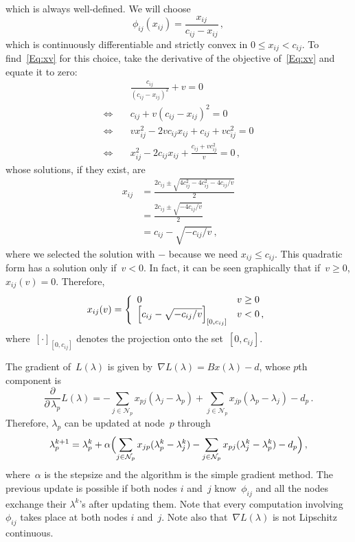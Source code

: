 \documentclass[letter,10pt]{article}
\theoremstyle{definition}
\theoremstyle{nonumberplain}
\begin{document}
	which is always well-defined. We will choose
	$$
		\phi_{ij}(x_{ij}) = \frac{x_{ij}}{c_{ij} - x_{ij}}\,,
	$$
	which is continuously differentiable and strictly convex in $0\leq x_{ij} < c_{ij}$. To find~\eqref{Eq:xv} for this choice, take the derivative of the objective of~\eqref{Eq:xv} and equate it to zero:
	\begin{align*}
		&\frac{c_{ij}}{(c_{ij} - x_{ij})^2} + v = 0
		\\
		\Longleftrightarrow\quad
		&
		c_{ij} + v(c_{ij} - x_{ij})^2 = 0
		\\
		\Longleftrightarrow\quad
		&
		v x_{ij}^2 - 2 v c_{ij} x_{ij} + c_{ij} + v c_{ij}^2 = 0
		\\
		\Longleftrightarrow\quad
		&
		x_{ij}^2 - 2 c_{ij} x_{ij} +  \frac{c_{ij} + v c_{ij}^2}{v} = 0\,,
	\end{align*}
	whose solutions, if they exist, are
	\begin{align*}
		  x_{ij}
		&=
		  \frac{2c_{ij} \pm \sqrt{4c_{ij}^2 - 4c_{ij}^2 - 4c_{ij}/v}}{2}
		\\
		&=
		  \frac{2c_{ij} \pm \sqrt{- 4c_{ij}/v}}{2}
		\\
		&=
		  c_{ij} - \sqrt{-c_{ij}/v}\,,
	\end{align*}
	where we selected the solution with $-$ because we need $x_{ij} \leq c_{ij}$. This quadratic form has a solution only if~$v < 0$. In fact, it can be seen graphically that if~$v \geq 0$, $x_{ij}(v) = 0$. Therefore,
	$$
		x_{ij}(v) =
		\left\{
			\begin{array}{ll}
				0 & v\geq 0 \\
				\Bigl[c_{ij} - \sqrt{-c_{ij}/v}\Bigr]_{[0,c_{ij}]} & v<0\,,
			\end{array}
		\right.
	$$
	where~$[\cdot]_{[0,c_{ij}]}$ denotes the projection onto the set~$[0,c_{ij}]$.

	The gradient of~$L(\lambda)$ is given by~$\nabla L(\lambda) = B x(\lambda) - d$, whose $p$th component is
	$$
		\frac{\partial}{\partial\, \lambda_p} L(\lambda) = -\sum_{j \in \mathcal{N}_p} x_{pj}(\lambda_j - \lambda_p) + \sum_{j \in \mathcal{N}_p} x_{jp}(\lambda_p - \lambda_j) - d_p\,.
	$$
	Therefore, $\lambda_p$ can be updated at node~$p$ through
	$$
		\lambda_p^{k+1} = \lambda_p^{k} + \alpha \Bigl(\sum_{j \in \mathcal{N}_p} x_{jp}(\lambda_p^k - \lambda_j^k)  -\sum_{j \in \mathcal{N}_p} x_{pj}(\lambda_j^k - \lambda_p^k) - d_p \Bigr)\,,
	$$
	where~$\alpha$ is the stepsize and the algorithm is the simple gradient method. The previous update is possible if both nodes $i$ and~$j$ know~$\phi_{ij}$ and all the nodes exchange their $\lambda^k$'s after updating them. Note that every computation involving $\phi_{ij}$ takes place at both nodes $i$ and~$j$. Note also that~$\nabla L(\lambda)$ is not Lipschitz continuous.
\end{document}
